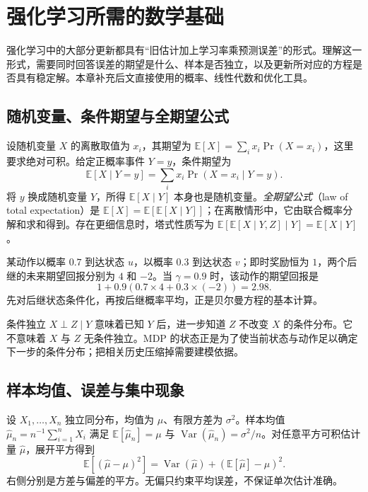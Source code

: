 \setcounter{chapter}{1} %
\chapter{强化学习所需的数学基础}
\label{ch:rl-math}

强化学习中的大部分更新都具有“旧估计加上学习率乘预测误差”的形式。理解这一形式，需要同时回答误差的期望是什么、样本是否独立，以及更新所对应的方程是否具有稳定解。本章补充后文直接使用的概率、线性代数和优化工具。

\section{随机变量、条件期望与全期望公式}

设随机变量 $X$ 的离散取值为 $x_i$，其期望为 $\mathbb E[X]=\sum_i x_i\Pr(X=x_i)$，这里要求绝对可积。给定正概率事件 $Y=y$，条件期望为
\[
\mathbb E[X\mid Y=y]=\sum_i x_i\Pr(X=x_i\mid Y=y).
\]
将 $y$ 换成随机变量 $Y$，所得 $\mathbb E[X\mid Y]$ 本身也是随机变量。\emph{全期望公式}（law of total expectation）是 $\mathbb E[X]=\mathbb E[\mathbb E[X\mid Y]]$；在离散情形中，它由联合概率分解和求和得到。存在更细信息时，塔式性质写为 $\mathbb E[\mathbb E[X\mid Y,Z]\mid Y]=\mathbb E[X\mid Y]$。

\begin{example}
某动作以概率 $0.7$ 到达状态 $u$，以概率 $0.3$ 到达状态 $v$；即时奖励恒为 $1$，两个后继的未来期望回报分别为 $4$ 和 $-2$。当 $\gamma=0.9$ 时，该动作的期望回报是
\[
1+0.9(0.7\times4+0.3\times(-2))=2.98.
\]
先对后继状态条件化，再按后继概率平均，正是贝尔曼方程的基本计算。
\end{example}

条件独立 $X\perp Z\mid Y$ 意味着已知 $Y$ 后，进一步知道 $Z$ 不改变 $X$ 的条件分布。它不意味着 $X$ 与 $Z$ 无条件独立。MDP 的状态正是为了使当前状态与动作足以确定下一步的条件分布；把相关历史压缩掉需要建模依据。

\section{样本均值、误差与集中现象}

设 $X_1,\ldots,X_n$ 独立同分布，均值为 $\mu$、有限方差为 $\sigma^2$。样本均值 $\widehat\mu_n=n^{-1}\sum_{i=1}^nX_i$ 满足 $\mathbb E[\widehat\mu_n]=\mu$ 与 $\operatorname{Var}(\widehat\mu_n)=\sigma^2/n$。对任意平方可积估计量 $\widehat\mu$，展开平方得到
\[
\mathbb E[(\widehat\mu-\mu)^2]
=\operatorname{Var}(\widehat\mu)+(\mathbb E[\widehat\mu]-\mu)^2.
\]
右侧分别是方差与偏差的平方。无偏只约束平均误差，不保证单次估计准确。

